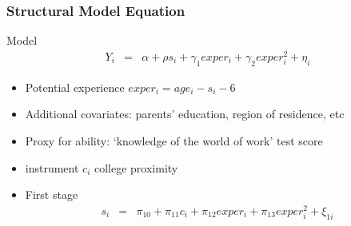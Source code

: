 \documentclass[pdftex]{beamer}
\begin{document}




\begin{frame}
\frametitle{Structural Model Equation}

Model
\begin{eqnarray*}
  Y_i &=& \alpha + \rho s_i + \gamma_1 exper_i + \gamma_2 exper_i^2 + \eta_i 
\end{eqnarray*}
\begin{itemize}
\item Potential experience $exper_i = age_i - s_i -6$
\item Additional covariates: parents' education, region of residence, etc
\item Proxy for ability: `knowledge of the world of work' test score
\item instrument $c_i$ college proximity
\item First stage
\begin{eqnarray*}
  s_i &=& \pi_{10} + \pi_{11} c_i  + \pi_{12} exper_i + \pi_{13} exper_i^2 + \xi_{1i}
\end{eqnarray*}
\end{itemize}

\end{frame}
\end{document}
